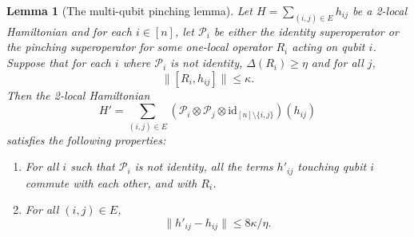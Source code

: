 \documentclass[11pt]{article}
\theoremstyle{plain}
\newtheorem{lemma}[theorem]{Lemma}
\renewcommand{\cP}{\mathcal{P}}
\begin{document}
\begin{lemma}[The multi-qubit pinching lemma]\label{lemma:extra-cheese}
    Let $H = \sum_{(i,j) \in E} h_{ij}$ be a 2-local Hamiltonian and for each $i \in [n]$, let $\mathcal{P}_i$ be either the identity superoperator or the pinching superoperator for some one-local operator $R_i$ acting on qubit $i$. Suppose that for each $i$ where $\mathcal{P}_i$ is not identity, $\Delta(R_i) \geq \eta$ and for all $j$, 
    \[ \|[R_i, h_{ij} ] \| \leq \kappa.\]
    Then the 2-local Hamiltonian
    \begin{equation}\label{eqn:definition-of-H-prime}
        H' = \sum_{(i,j) \in E} (\cP_i \otimes \cP_j \otimes \mathrm{id}_{[n]\setminus \{i,j\}})( h_{ij})
    \end{equation}
    satisfies the following properties:
    \begin{enumerate}
        \item For all $i$ such that $\cP_i$ is not identity, all the terms $h'_{ij}$ touching qubit $i$ commute with each other, and with $R_i$.
        \item For all $(i,j) \in E$,
        \begin{equation} \| h'_{ij} - h_{ij} \| \leq 8 \kappa/\eta. \label{eq:cheese-rounding-error} \end{equation}
    \end{enumerate}
\end{lemma}
\end{document}
